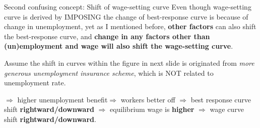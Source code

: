 \documentclass{beamer}
\begin{document}
\begin{frame}
\end{frame}

\begin{frame}{Second confusing concept: Shift of wage-setting curve}
\label{slide:Second_confusing_concept__Shift_of_wage_setting_curve}
    Even though wage-setting curve is derived by IMPOSING the change of best-response curve is because of change in unemployment, yet as I mentioned before, \textbf{other factors} can also shift the best-response curve, and \textbf{change in any factors other than (un)employment and wage will also shift the wage-setting curve}.

    Assume the shift in curves within the figure in next slide is originated from \textit{more generous unemployment insurance scheme}, which is NOT related to unemployment rate.

    $ \Rightarrow  $ higher unemployment benefit$ \Rightarrow  $ workers better off $ \Rightarrow  $ best response curve shift \textbf{rightward/downward} $ \Rightarrow  $ equilibrium wage is \textbf{higher} $ \Rightarrow  $ wage curve shift \textbf{rightward/downward}.

\end{frame}
\end{document}

